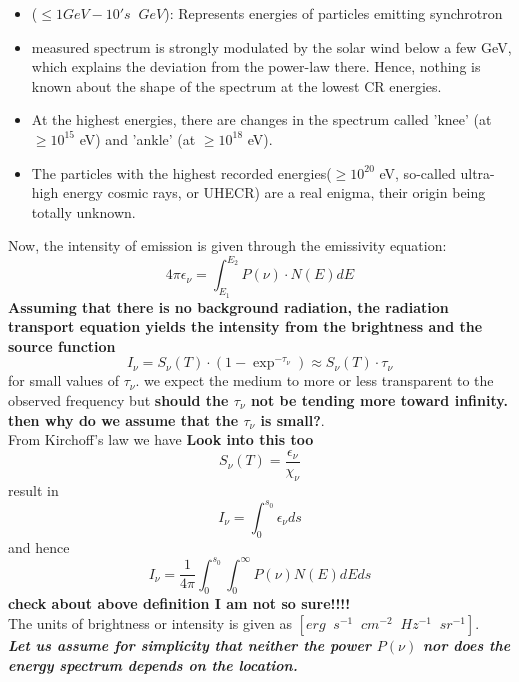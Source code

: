 \documentclass[12pt]{report}
\newcommand{\tbf}[1]{\textbf{#1}}
\newcommand{\tit}[1]{\textit{#1}}
\newcommand{\rr}[1]{\left[{#1}\right]}
\begin{document}
\begin{itemize}
\item ($\leq 1GeV - 10's\;\;GeV$): Represents energies of particles emitting synchrotron
\item  measured spectrum is strongly modulated by the solar wind below a few GeV, which explains the deviation from the power-law there. Hence, nothing is known about the shape of the spectrum at the lowest CR energies. 
\item  At the highest energies, there are changes in the spectrum called 'knee' (at $\geq 10^{15}$ eV) and 'ankle' (at $\geq 10^{18}$ eV).
\item  The particles with the highest recorded energies($\geq 10^{20}$ eV, so-called ultra-high energy cosmic rays, or UHECR) are a real enigma, their origin being totally unknown.

\end{itemize}
Now, the intensity of emission is given through the emissivity equation:
\begin{equation}
4 \pi \epsilon_\nu=\int^{E_2}_{E_1}P(\nu)\cdot N(E)dE
\end{equation}
\textbf{Assuming that there is no background radiation, the radiation transport equation yields the intensity from the brightness and the source function}
\begin{equation}
I_\nu=S_\nu(T)\cdot (1-\exp^{-\tau_\nu}) \approx S_\nu(T)\cdot \tau_\nu
\end{equation}
for small values of $\tau_\nu$. we expect the medium to more or less transparent to the observed frequency but \textbf{should the $\tau_\nu$ not be tending more toward infinity. then why do we assume that the $\tau_\nu$ is small?}.\\
From Kirchoff's law we have \textbf{Look into this too}
\begin{equation}
S_\nu(T)=\frac{\epsilon_\nu}{\chi_\nu}
\end{equation}
result in
\begin{equation}
I_\nu=\int^{s_0}_0\epsilon_\nu ds
\end{equation}
and hence
\begin{equation}
I_\nu=\frac{1}{4\pi}\int^{s_0}_0 \int^{\infty}_0 P(\nu) N(E)dEds
\end{equation}
\textbf{check about above definition I am not so sure!!!!}\\
The units of brightness or intensity is given as $\rr{erg\;\;s^{-1}\;\;cm^{-2}\;\;Hz^{-1}\;\;sr^{-1}}$.\\
\tbf{\tit{ Let us assume for simplicity that neither the power $P(\nu)$ nor does the energy spectrum depends on the location.}}\\
\end{document}
